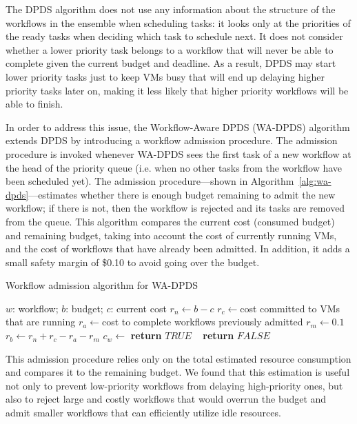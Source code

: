 \documentclass[conference]{IEEEtran}
\begin{document}
The DPDS algorithm does not use any information about the structure of the
workflows in the ensemble when scheduling tasks: it looks only at the priorities
of the ready tasks when deciding which task to schedule next. It does not
consider whether a lower priority task belongs to a workflow that will never be
able to complete given the current budget and deadline. As a result, DPDS may
start lower priority tasks just to keep VMs busy that will end up delaying
higher priority tasks later on, making it less likely that higher priority
workflows will be able to finish.


In order to address this issue, the Workflow-Aware DPDS (WA-DPDS) algorithm
extends DPDS by introducing a workflow admission procedure. The admission
procedure is invoked whenever WA-DPDS sees the first task of a new workflow at
the head of the priority queue (i.e. when no other tasks from the workflow have
been scheduled yet). The admission procedure---shown in
Algorithm~\ref{alg:wa-dpds}---estimates whether there is enough budget remaining
to admit the new workflow; if there is not, then the workflow is rejected and
its tasks are removed from the queue. This algorithm compares the current cost
(consumed budget) and remaining budget, taking into account the cost of
currently running VMs, and the cost of workflows that have already been
admitted. In addition, it adds a small safety margin of \$0.10 to avoid going
over the budget.


\begin{algorithm}[tb]
\caption{Workflow admission algorithm for WA-DPDS}
\label{alg:wa-dpds}
{\footnotesize
\begin{algorithmic}[1]
\Require $w$: workflow; $b$: budget; $c$: current cost
    \State $r_n\gets b-c$ 
    \State $r_c\gets $cost committed to VMs that are running
    \State $r_a\gets $cost to complete workflows previously admitted
  \State $r_m\gets 0.1$ 
  \State $r_b\gets r_n+r_c-r_a-r_m$ 
  \State $c_w\gets$ 
      \textbf{return} $TRUE$
    \Else ~  \textbf{return} $FALSE$
  \EndIf       
\EndProcedure
\end{algorithmic}
}
\end{algorithm}

This admission procedure relies only on the total estimated resource consumption
and compares it to the remaining budget. We found that this estimation is useful
not only to prevent low-priority workflows from delaying high-priority ones, but
also to reject large and costly workflows that would overrun the budget and
admit smaller workflows that can efficiently utilize idle resources.
\end{document}
